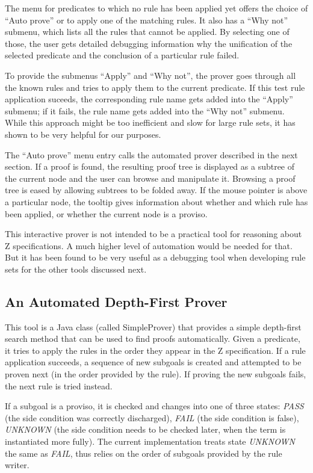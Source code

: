 \documentclass{entcs}
\begin{document}
The menu for predicates to which no rule has been applied yet offers the
choice of ``Auto prove'' or to apply one of the matching
rules.  It also has a ``Why not'' submenu, which lists all the rules
that cannot be applied.  By selecting one of those, the user gets
detailed debugging information why the unification of the selected
predicate and the conclusion of a particular rule failed.

To provide the submenus ``Apply'' and ``Why not'', the prover goes
through all the known rules and tries to apply them to the current
predicate.  If this test rule application suceeds, the corresponding
rule name gets added into the ``Apply'' submenu; if it fails, the rule
name gets added into the ``Why not'' submenu.  While this approach
might be too inefficient and slow for large rule sets, it has shown to
be very helpful for our purposes.

The ``Auto prove'' menu entry calls the automated prover described in
the next section.  If a proof is found, the resulting proof tree is
displayed as a subtree of the current node and the user can browse and
manipulate it.  Browsing a proof tree is eased by allowing subtrees to
be folded away.  If the mouse pointer is above a particular node, the
tooltip gives information about whether and which rule has been
applied, or whether the current node is a proviso.

This interactive prover is not intended to be a practical tool for
reasoning about Z specifications.  A much higher level of automation
would be needed for that.  But it has been found to be very useful as
a debugging tool when developing rule sets for the other tools discussed
next. 

\subsection{An Automated Depth-First Prover}

This tool is a Java class (called SimpleProver) that provides a simple
depth-first search method that can be used to find proofs automatically.
Given a predicate, it tries to apply the rules in the order they
appear in the Z specification.  If a rule application succeeds, a
sequence of new subgoals is created and attempted to be proven next
(in the order provided by the rule).  If proving the new subgoals
fails, the next rule is tried instead.

If a subgoal is a proviso, it is checked and changes into one of three
states: \emph{PASS} (the side condition was correctly discharged),
\emph{FAIL} (the side condition is false), \emph{UNKNOWN} (the
side condition needs to be checked later, when the term is
instantiated more fully).  The current implementation treats state
\emph{UNKNOWN} the same as \emph{FAIL}, thus relies on the order of
subgoals provided by the rule writer.
\end{document}

